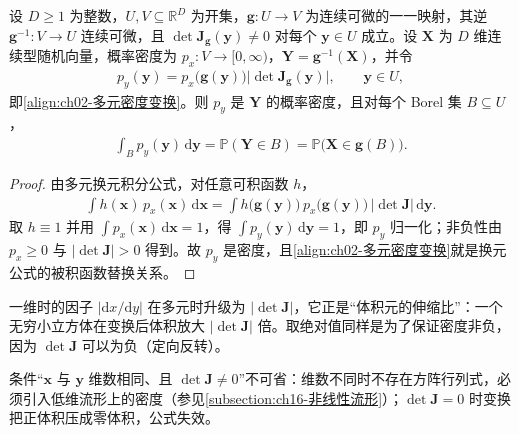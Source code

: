 \documentclass[../../main.tex]{subfiles}
\begin{document}
\begin{proposition}[多元密度变换公式]\label{proposition:ch02-多元密度变换}
设 $D\geqslant1$ 为整数，$U,V\subseteq\mathbb{R}^{D}$ 为开集，$\mathbf{g}:U\to V$ 为连续可微的一一映射，其逆 $\mathbf{g}^{-1}:V\to U$ 连续可微，且 $\det\mathbf{J}_{\mathbf{g}}(\mathbf{y})\neq0$ 对每个 $\mathbf{y}\in U$ 成立。设 $\mathbf{X}$ 为 $D$ 维连续型随机向量，概率密度为 $p_x:V\to[0,\infty)$，$\mathbf{Y}=\mathbf{g}^{-1}(\mathbf{X})$，并令
\begin{align*}
  p_y(\mathbf{y})=p_x\big(\mathbf{g}(\mathbf{y})\big)\big|\det\mathbf{J}_{\mathbf{g}}(\mathbf{y})\big|,\qquad \mathbf{y}\in U,
\end{align*}
即\eqref{align:ch02-多元密度变换}。则 $p_y$ 是 $\mathbf{Y}$ 的概率密度，且对每个 Borel 集 $B\subseteq U$，
\begin{align*}
  \int_B p_y(\mathbf{y})\,\mathrm{d}\mathbf{y}=\mathbb{P}(\mathbf{Y}\in B)=\mathbb{P}\big(\mathbf{X}\in\mathbf{g}(B)\big).
\end{align*}
\end{proposition}

\begin{proof}
由多元换元积分公式，对任意可积函数 $h$，
\begin{align*}
 \int h(\mathbf{x})\,p_x(\mathbf{x})\,\mathrm{d}\mathbf{x}
 = \int h\big(\mathbf{g}(\mathbf{y})\big)\,p_x\big(\mathbf{g}(\mathbf{y})\big)\,\big|\det\mathbf{J}\big|\,\mathrm{d}\mathbf{y} .
\end{align*}
取 $h\equiv1$ 并用 $\int p_x(\mathbf{x})\,\mathrm{d}\mathbf{x}=1$，得 $\int p_y(\mathbf{y})\,\mathrm{d}\mathbf{y}=1$，即 $p_y$ 归一化；非负性由 $p_x\geqslant0$ 与 $|\det\mathbf{J}|>0$ 得到。故 $p_y$ 是密度，且\eqref{align:ch02-多元密度变换}就是换元公式的被积函数替换关系。
\end{proof}

\begin{remark}
一维时的因子 $|\mathrm{d}x/\mathrm{d}y|$ 在多元时升级为 $|\det\mathbf{J}|$，它正是“体积元的伸缩比”：一个无穷小立方体在变换后体积放大 $|\det\mathbf{J}|$ 倍。取绝对值同样是为了保证密度非负，因为 $\det\mathbf{J}$ 可以为负（定向反转）。

条件“$\mathbf{x}$ 与 $\mathbf{y}$ 维数相同、且 $\det\mathbf{J}\neq0$”不可省：维数不同时不存在方阵行列式，必须引入低维流形上的密度（参见\cref{subsection:ch16-非线性流形}）；$\det\mathbf{J}=0$ 时变换把正体积压成零体积，公式失效。
\end{remark}
\end{document}
